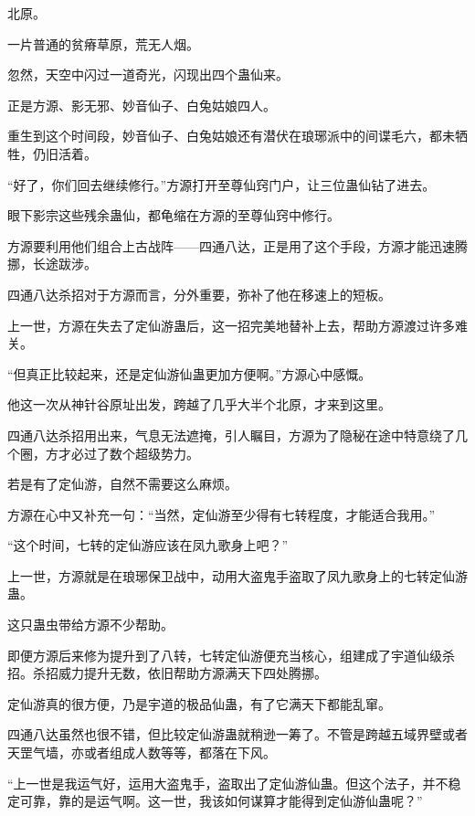 
\begin{this_body}

北原。

一片普通的贫瘠草原，荒无人烟。

忽然，天空中闪过一道奇光，闪现出四个蛊仙来。

正是方源、影无邪、妙音仙子、白兔姑娘四人。

重生到这个时间段，妙音仙子、白兔姑娘还有潜伏在琅琊派中的间谍毛六，都未牺牲，仍旧活着。

“好了，你们回去继续修行。”方源打开至尊仙窍门户，让三位蛊仙钻了进去。

眼下影宗这些残余蛊仙，都龟缩在方源的至尊仙窍中修行。

方源要利用他们组合上古战阵——四通八达，正是用了这个手段，方源才能迅速腾挪，长途跋涉。

四通八达杀招对于方源而言，分外重要，弥补了他在移速上的短板。

上一世，方源在失去了定仙游蛊后，这一招完美地替补上去，帮助方源渡过许多难关。

“但真正比较起来，还是定仙游仙蛊更加方便啊。”方源心中感慨。

他这一次从神针谷原址出发，跨越了几乎大半个北原，才来到这里。

四通八达杀招用出来，气息无法遮掩，引人瞩目，方源为了隐秘在途中特意绕了几个圈，方才必过了数个超级势力。

若是有了定仙游，自然不需要这么麻烦。

方源在心中又补充一句：“当然，定仙游至少得有七转程度，才能适合我用。”

“这个时间，七转的定仙游应该在凤九歌身上吧？”

上一世，方源就是在琅琊保卫战中，动用大盗鬼手盗取了凤九歌身上的七转定仙游蛊。

这只蛊虫带给方源不少帮助。

即便方源后来修为提升到了八转，七转定仙游便充当核心，组建成了宇道仙级杀招。杀招威力提升无数，依旧帮助方源满天下四处腾挪。

定仙游真的很方便，乃是宇道的极品仙蛊，有了它满天下都能乱窜。

四通八达虽然也很不错，但比较定仙游蛊就稍逊一筹了。不管是跨越五域界壁或者天罡气墙，亦或者组成人数等等，都落在下风。

“上一世是我运气好，运用大盗鬼手，盗取出了定仙游仙蛊。但这个法子，并不稳定可靠，靠的是运气啊。这一世，我该如何谋算才能得到定仙游仙蛊呢？”


\end{this_body}
